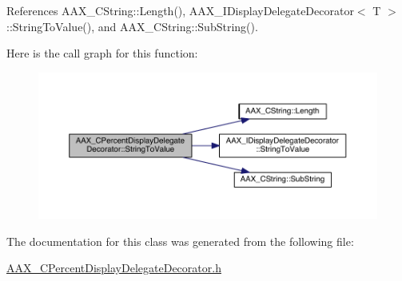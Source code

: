 References A\+A\+X\+\_\+\+C\+String\+::\+Length(), A\+A\+X\+\_\+\+I\+Display\+Delegate\+Decorator$<$ T $>$\+::\+String\+To\+Value(), and A\+A\+X\+\_\+\+C\+String\+::\+Sub\+String().



Here is the call graph for this function\+:
\nopagebreak
\begin{figure}[H]
\begin{center}
\leavevmode
\includegraphics[width=350pt]{a00036_a702a4dea21a72dc8edf6b91b5a5bf5e5_cgraph}
\end{center}
\end{figure}




The documentation for this class was generated from the following file\+:\begin{DoxyCompactItemize}
\item 
\hyperlink{a00192}{A\+A\+X\+\_\+\+C\+Percent\+Display\+Delegate\+Decorator.\+h}\end{DoxyCompactItemize}
